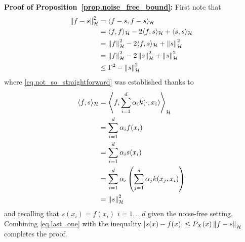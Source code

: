 \begin{my_proof}
	\textbf{Proof of Proposition~\ref{prop.noise_free_bound}:}
	First note that 
	\begin{align}
		\left\| f-s \right\|_\mathcal{H}^2 &= \langle f-s, f-s \rangle_\mathcal{H} \\
		&= \langle f, f \rangle_\mathcal{H} - 2\langle f, s \rangle_\mathcal{H} + \langle s, s \rangle_\mathcal{H} \\
		&= \left\| f \right\|_\mathcal{H}^2 - 2\langle f, s \rangle_\mathcal{H} + \left\| s \right\|_\mathcal{H}^2 \\
		&= \left\| f \right\|_\mathcal{H}^2 - 2\left\| s \right\|_\mathcal{H}^2 + \left\| s \right\|_\mathcal{H}^2 \label{eq.not_so_straightforward}\\
		&\leq \Gamma^2 -  \left\| s \right\|_\mathcal{H}^2 \label{eq.last_one}
	\end{align}
	where \eqref{eq.not_so_straightforward} was established thanks to 
	\begin{align}
		\langle f, s \rangle_\mathcal{H} &= \left\langle f, \sum_{i=1}^d \alpha_i k(\cdot,x_i) \right\rangle_\mathcal{H} \\
		&= \sum_{i=1}^d \alpha_i f(x_i) \\
		&= \sum_{i=1}^d \alpha_i  s (x_i) \\
		&= \sum_{i=1}^d \alpha_i \left(\sum_{j=1}^d \alpha_j k(x_j,x_i) \right) \\
		&= \left\| s \right\|_\mathcal{H}^2
	\end{align}
	and recalling that $s(x_i) = f(x_i)$ $i=1,\dots d$ given the noise-free setting. Combining \eqref{eq.last_one} with the inequality $|s(x) - f(x)| \leq P_X(x) \left\| f - s \right\|_\mathcal{H}$ \cite[§11.5]{wendland2004scattered} completes the proof. 
\end{my_proof}

